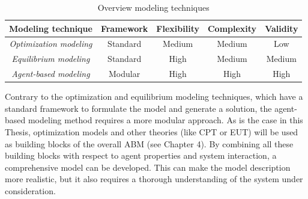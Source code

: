 \begin{table}[h!]
    \centering
    \begin{tabular}{||c|c|c|c|c||}
    \hline 
        \textbf{Modeling technique} & Framework & Flexibility & Complexity & Validity \\
    \hline \hline
         \textit{Optimization modeling} & Standard & Medium & Medium & Low \\
    \hline
        \textit{Equilibrium modeling} & Standard &  High & Medium & Medium\\
    \hline 
        \textit{Agent-based modeling} & Modular & High & High & High\\
    \hline 
    \end{tabular}
    \caption{Overview modeling techniques}
    \label{tab:overview2}
\end{table}
Contrary to the optimization and equilibrium modeling techniques, which have a standard framework to formulate the model and generate a solution, the agent-based modeling method requires a more modular approach. As is the case in this Thesis, optimization models and other theories (like CPT or EUT) will be used as building blocks of the overall ABM (see Chapter 4). By combining all these building blocks with respect to agent properties and system interaction, a comprehensive model can be developed. This can make the model description more realistic, but it also requires a thorough understanding of the system under consideration.
